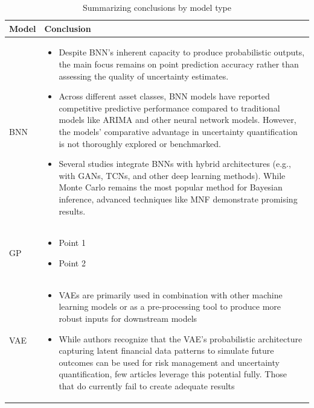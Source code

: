 \begin{table}[ht!]
    \centering
    \caption[Summarizing conclusions by model type]{Summarizing conclusions by model type}
    \label{table:conclusions_by_model}
    \small
    \begin{adjustbox}{width=1\textwidth,center}
    \begin{tabular}{p{}p{}}
        \toprule
        \textbf{Model} & \textbf{Conclusion} \\
        \midrule
        BNN & 
        \begin{itemize}[left=0pt]
        \vspace{-4mm}
            \item Despite BNN's inherent capacity to produce probabilistic outputs, the main focus remains on point prediction accuracy rather than assessing the quality of uncertainty estimates.
            \item Across different asset classes, BNN models have reported competitive predictive performance compared to traditional models like ARIMA and other neural network models. However, the models' comparative advantage in uncertainty quantification is not thoroughly explored or benchmarked.
            \item Several studies integrate BNNs with hybrid architectures (e.g., with GANs, TCNs, and other deep learning methods). While Monte Carlo remains the most popular method for Bayesian inference, advanced techniques like MNF demonstrate promising results.
        \end{itemize} \\
        \hdashline[0.2pt/3pt]
        \addlinespace
        GP & 
        \begin{itemize}[left=0pt]
        \vspace{-4mm}
            \item Point 1
            \item Point 2
        \end{itemize} \\
        \addlinespace
        \hdashline[0.2pt/3pt]
        \addlinespace
        VAE & 
        \begin{itemize}[left=0pt]
        \vspace{-4mm}
            \item VAEs are primarily used in combination with other machine learning models or as a pre-processing tool to produce more robust inputs for downstream models
            \item While authors recognize that the VAE’s probabilistic architecture capturing latent financial data patterns to simulate future outcomes can be used for risk management and uncertainty quantification, few articles leverage this potential fully. Those that do currently fail to create adequate results

\end{itemize}
\end{tabular}
\end{adjustbox}
\end{table}
